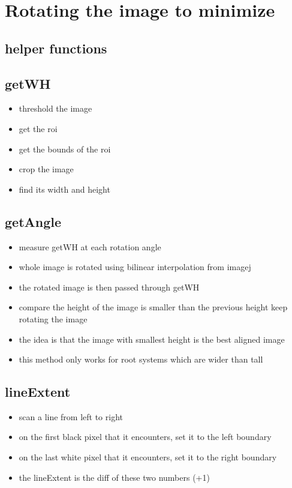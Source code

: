 \documentclass[11pt]{article}
\author{adam}
\date{\today}
\title{}
\begin{document}
\tableofcontents



\section{Rotating the image to minimize}
\label{sec:orgf605563}
\subsection{helper functions}
\label{sec:org5db7722}
\subsection{getWH}
\label{sec:orgdc635ed}
\begin{itemize}
\item threshold the image
\item get the roi
\item get the bounds of the roi
\item crop the image
\item find its width and height
\end{itemize}
\subsection{getAngle}
\label{sec:orgecf3ec5}
\begin{itemize}
\item measure getWH at each rotation angle
\item whole image is rotated using bilinear interpolation from imagej
\item the rotated image is then passed through getWH
\item compare the height of the image is smaller than the previous height
keep rotating the image
\item the idea is that the image with smallest height is the best aligned
image
\item this method only works for root systems which are wider than tall
\end{itemize}

\subsection{lineExtent}
\label{sec:orgfb15970}
\begin{itemize}
\item scan a line from left to right
\item on the first black pixel that it encounters, set it to the left
boundary
\item on the last white pixel that it encounters, set it to the right
boundary
\item the lineExtent is the diff of these two numbers (+1)
\end{itemize}
\end{document}
